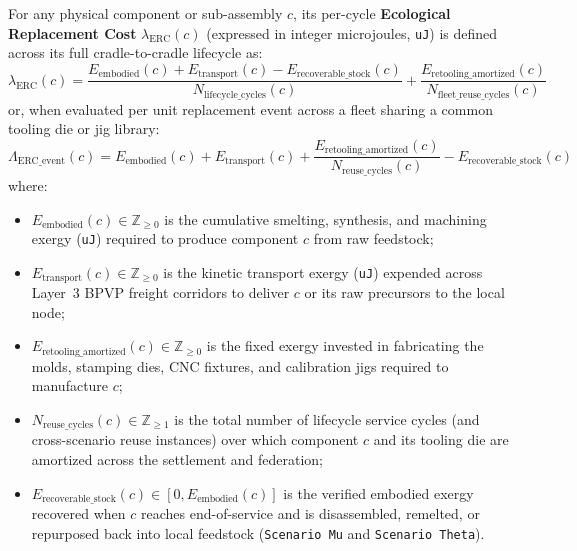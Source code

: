 \begin{definition}
\label{def:ch2-component-erc}
For any physical component or sub-assembly $c$, its per-cycle \textbf{Ecological Replacement Cost} $\lambda_{\mathrm{ERC}}(c)$ (expressed in integer microjoules, \texttt{uJ}) is defined across its full cradle-to-cradle lifecycle as:
\begin{equation}
\lambda_{\mathrm{ERC}}(c) = \frac{E_{\mathrm{embodied}}(c) + E_{\mathrm{transport}}(c) - E_{\mathrm{recoverable\_stock}}(c)}{N_{\mathrm{lifecycle\_cycles}}(c)} + \frac{E_{\mathrm{retooling\_amortized}}(c)}{N_{\mathrm{fleet\_reuse\_cycles}}(c)}
\label{eq:ch2-erc-lifecycle}
\end{equation}
or, when evaluated per unit replacement event across a fleet sharing a common tooling die or jig library:
\begin{equation}
\Lambda_{\mathrm{ERC\_event}}(c) = E_{\mathrm{embodied}}(c) + E_{\mathrm{transport}}(c) + \frac{E_{\mathrm{retooling\_amortized}}(c)}{N_{\mathrm{reuse\_cycles}}(c)} - E_{\mathrm{recoverable\_stock}}(c)
\label{eq:ch2-erc-event}
\end{equation}
where:
\begin{itemize}
    \item $E_{\mathrm{embodied}}(c) \in \mathbb{Z}_{\ge 0}$ is the cumulative smelting, synthesis, and machining exergy (\texttt{uJ}) required to produce component $c$ from raw feedstock;
    \item $E_{\mathrm{transport}}(c) \in \mathbb{Z}_{\ge 0}$ is the kinetic transport exergy (\texttt{uJ}) expended across Layer~3 BPVP freight corridors to deliver $c$ or its raw precursors to the local node;
    \item $E_{\mathrm{retooling\_amortized}}(c) \in \mathbb{Z}_{\ge 0}$ is the fixed exergy invested in fabricating the molds, stamping dies, CNC fixtures, and calibration jigs required to manufacture $c$;
    \item $N_{\mathrm{reuse\_cycles}}(c) \in \mathbb{Z}_{\ge 1}$ is the total number of lifecycle service cycles (and cross-scenario reuse instances) over which component $c$ and its tooling die are amortized across the settlement and federation;
    \item $E_{\mathrm{recoverable\_stock}}(c) \in [0, E_{\mathrm{embodied}}(c)]$ is the verified embodied exergy recovered when $c$ reaches end-of-service and is disassembled, remelted, or repurposed back into local feedstock (\texttt{Scenario Mu} and \texttt{Scenario Theta}).
\end{itemize}
\end{definition}

